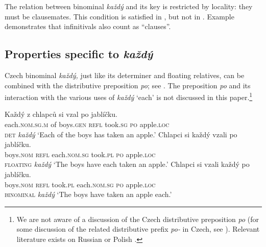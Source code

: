 \documentclass[output=paper,colorlinks,citecolor=brown,newtxmath]{langscibook}
\begin{document}
\noindent The relation between binominal \textit{každý} and its key is restricted by locality: they must be clausemates. This condition is satisfied in , but not in . Example  demonstrates that infinitivals also count as ``clauses''.

\ea{}
\z\z

\subsection{Properties specific to \textit{každý}}\label{s2.2}

Czech binominal \textit{každý,} just like its determiner and floating relatives, can be combined with the distributive preposition \textit{po}; see . The preposition \textit{po} and its interaction with the various uses of \textit{každý} `each' is not discussed in this paper.\footnote{We are not aware of a discussion of the Czech distributive preposition \textit{po} (for some discussion of the related distributive prefix \textit{po-} in Czech, see \citealt{Biskup2017}). Relevant literature exists on Russian \citep{Pesetsky1982,Harves2003,Kuznetsova2005} or Polish \citep{Przepiorkowski2008,Przepiorkowski2013}.}

\ea\label{ex:po}\ea\label{ex:po-without}\gll Každý z chlapců si vzal po jablíčku.\\
each.\textsc{nom.sg.m} of boys.\textsc{gen} \textsc{refl} took.\textsc{sg} \textsc{po} apple.\textsc{loc}\\\hfill \textsc{det} \textit{každý}
\glt `Each of the boys has taken an apple.'
\ex\label{ex:po-float}\gll Chlapci si každý vzali po jablíčku.\\
boys.\textsc{nom} \textsc{refl} each.\textsc{nom.sg} took.\textsc{pl} \textsc{po} apple.\textsc{loc}\\\hfill \textsc{floating} \textit{každý}
\glt `The boys have each taken an apple.'
\ex\label{ex:po-binom}\gll Chlapci si vzali každý po jablíčku.\\
boys.\textsc{nom} \textsc{refl} took.\textsc{pl} each.\textsc{nom.sg} \textsc{po} apple.\textsc{loc}\\\hfill \textsc{binominal} \textit{každý}
\glt `The boys have taken an apple each.'
\z\z
\end{document}
